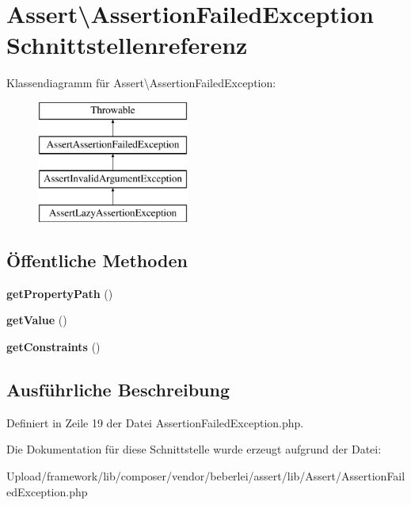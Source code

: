 \hypertarget{interface_assert_1_1_assertion_failed_exception}{}\section{Assert\textbackslash{}Assertion\+Failed\+Exception Schnittstellenreferenz}
\label{interface_assert_1_1_assertion_failed_exception}
Klassendiagramm für Assert\textbackslash{}Assertion\+Failed\+Exception\+:\begin{figure}[H]
\begin{center}
\leavevmode
\includegraphics[height=4.000000cm]{interface_assert_1_1_assertion_failed_exception}
\end{center}
\end{figure}
\subsection*{Öffentliche Methoden}
\begin{DoxyCompactItemize}
\item 
\mbox{\label{interface_assert_1_1_assertion_failed_exception_afeedede7ccc7355fcd027cb81075bffd}} 
{\bfseries get\+Property\+Path} ()
\item 
\mbox{\label{interface_assert_1_1_assertion_failed_exception_a61ea6abef22f61b226842631eb29aaa1}} 
{\bfseries get\+Value} ()
\item 
\mbox{\label{interface_assert_1_1_assertion_failed_exception_a888967a069ecb079387cedfd06eca80c}} 
{\bfseries get\+Constraints} ()
\end{DoxyCompactItemize}


\subsection{Ausführliche Beschreibung}


Definiert in Zeile 19 der Datei Assertion\+Failed\+Exception.\+php.



Die Dokumentation für diese Schnittstelle wurde erzeugt aufgrund der Datei\+:\begin{DoxyCompactItemize}
\item 
Upload/framework/lib/composer/vendor/beberlei/assert/lib/\+Assert/Assertion\+Failed\+Exception.\+php\end{DoxyCompactItemize}
